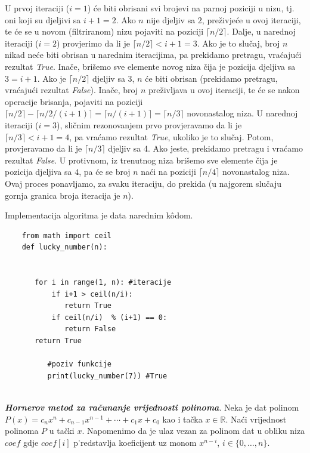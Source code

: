  \begin{solution}
U prvoj iteraciji ($i=1$) će biti obrisani svi brojevi na parnoj poziciji u nizu, tj. oni koji su djeljivi sa $i+1=2$. Ako $n$ nije djeljiv sa $2$, preživjeće u ovoj iteraciji, te će se u novom (filtriranom) nizu pojaviti na poziciji $\lceil n/2 \rceil$. Dalje, u narednoj iteraciji ($i=2$) provjerimo da li je $\lceil n/2 \rceil < i+1=3$. Ako je to slučaj, broj $n$ nikad neće biti obrisan u narednim iteracijima, pa prekidamo pretragu, vraćajući rezultat \emph{True}. Inače, brišemo sve elemente novog niza čija je pozicija djeljiva sa $3=i+1$. Ako je $\lceil n/2 \rceil$ djeljiv sa 3, $n$ će biti obrisan (prekidamo pretragu, vraćajući rezultat \emph{False}). Inače, broj $n$ preživljava u ovoj iteraciji, te će se nakon operacije brisanja, pojaviti na poziciji $\lceil n/2 \rceil - \lceil n/2 /(i+1)\rceil = \lceil n/(i+1) \rceil = \lceil n/3 \rceil$ novonastalog niza. U narednoj iteraciji ($i=3$), sličnim rezonovanjem prvo provjeravamo da li je $\lceil n/3 \rceil < i+1=4$, pa vraćamo rezultat \emph{True}, ukoliko je to slučaj. Potom, provjeravamo da li je
 $\lceil n/3 \rceil$ djeljiv sa 4. Ako jeste, prekidamo pretragu i vraćamo rezultat \emph{False}. U protivnom, iz trenutnog niza brišemo sve elemente čija je pozicija djeljiva sa $4$, pa će se broj $n$ naći na poziciji $\lceil n/4 \rceil$ novonastalog niza. Ovaj proces ponavljamo, za svaku iteraciju, do prekida (u najgorem slučaju gornja granica broja iteracija je $n$).  
 
 
 Implementacija algoritma je data narednim k\^odom. 
 
 \begin{verbatim}
 	from math import ceil
 	def lucky_number(n):
 
 	      
 	   for i in range(1, n): #iteracije
 	       if i+1 > ceil(n/i):
 	          return True 
 	       if ceil(n/i)  % (i+1) == 0:
 	          return False
 	   return True       
    
          #poziv funkcije
          print(lucky_number(7)) #True	       
  
 \end{verbatim}
  
 \end{solution}
 
\begin{definition}
	\textbf{\textit{Hornerov metod za računanje vrijednosti polinoma}}. Neka je dat polinom $P(x)=c_n x^n + c_{n-1}x^{n-1} + \cdots + c_1 x + c_0$ kao i tačka $x \in \mathbb{R}$. Naći vrijednost polinoma $P$ u tački $x$. Napomenimo da je ulaz vezan za polinom dat u obliku niza $ coef$ gdje   $coef[i]$ p˙redstavlja koeficijent uz monom  $x^{n-i}$, $i \in \{0, \ldots, n\}$. 

\end{definition}

